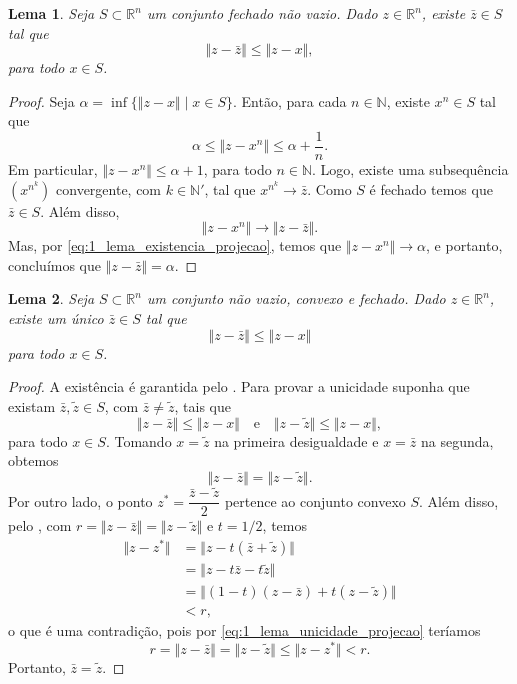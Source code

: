\documentclass[12pt,a4paper]{scrartcl}
\def\RR{\mathds{R}}
\newtheorem{lema}{Lema}
\theoremstyle{definition}%
\begin{document}
\begin{lema} \label{lema:existencia_projecao}
Seja $S \subset \RR^{n}$ um conjunto fechado não vazio. Dado $z \in \RR^{n}$, existe $\bar{z} \in S$ tal que
\[
\Vert z - \bar{z} \Vert \leq \Vert z - x \Vert,
\]
para todo $x \in S$.
\end{lema}
\begin{proof}
Seja $\alpha = \inf \{\Vert z-x \Vert \mid x \in S\}$. Então, para cada $n \in \mathds{N}$, existe $x^{n} \in S$ tal que
\[ \label{eq:1_lema_existencia_projecao}
\alpha \leq \Vert z-x^{n} \Vert \leq \alpha + \dfrac{1}{n}. 
\]
Em particular, $\Vert z-x^{n} \Vert \leq \alpha + 1$, para todo $n \in \mathds{N}$. Logo, existe uma subsequência $(x^{n^{k}})$ convergente, com $k \in \mathds{N}'$, tal que $x^{n^{k}} \longrightarrow \bar{z}$. Como $S$ é fechado temos que $\bar{z} \in S$. Além disso, 
\[
\Vert z-x^{n} \Vert \longrightarrow \Vert z-\bar{z} \Vert .
\]
Mas, por \eqref{eq:1_lema_existencia_projecao}, temos que $\Vert z-x^{n} \Vert \longrightarrow \alpha $, e portanto, concluímos que $\Vert z-\bar{z} \Vert = \alpha$.

\end{proof}


\begin{lema}  \label{lema:unicidadeprojecao_convexidade}
Seja $S \subset \RR^{n}$ um conjunto não vazio, convexo e fechado. Dado $z \in \RR^{n}$, existe um único $\bar{z} \in S$ tal que
\[
\Vert z - \bar{z} \Vert \leq \Vert z - x \Vert
\]
para todo $x \in S$.
\end{lema}
\begin{proof}
A existência é garantida pelo . Para provar a unicidade suponha que existam $\bar{z}, \tilde{z} \in S$, com $\bar{z} \neq \tilde{z}$, ta{}is que
\[ \label{eq:1_lema_unicidade_projecao}
\Vert z-\bar{z} \Vert \leq \Vert z-x \Vert \quad \text{e} \quad \Vert z-\tilde{z} \Vert \leq \Vert z-x \Vert ,
\]
para todo $x \in S$. Tomando $x=\tilde{z}$ na primeira desigualdade e $x=\bar{z}$ na segunda, obtemos
\[
\Vert z-\bar{z} \Vert = \Vert z-\tilde{z} \Vert .
\]
Por outro lado, o ponto $z^{*} = \dfrac{\bar{z} - \tilde{z}}{2}$ pertence ao conjunto convexo $S$. Além disso, pelo , com $r= \Vert z-\bar{z} \Vert = \Vert z - \tilde{z} \Vert$ e $t=1/2$, temos
\begin{align}
\Vert z-z^{*} \Vert &=  \Vert z-t(\bar{z}+\tilde{z}) \Vert \\
& = \Vert z - t\bar{z} - t\tilde{z} \Vert \\
& = \Vert (1-t)(z-\bar{z}) + t(z-\tilde{z}) \Vert \\
& < r ,
\end{align}
o que é uma contradição, pois por \eqref{eq:1_lema_unicidade_projecao} teríamos
\[
r = \Vert z-\bar{z} \Vert = \Vert z - \tilde{z} \Vert \leq \Vert z-z^{*} \Vert < r .
\]
Portanto, $\bar{z} = \tilde{z}$.
\end{proof}
\end{document}

